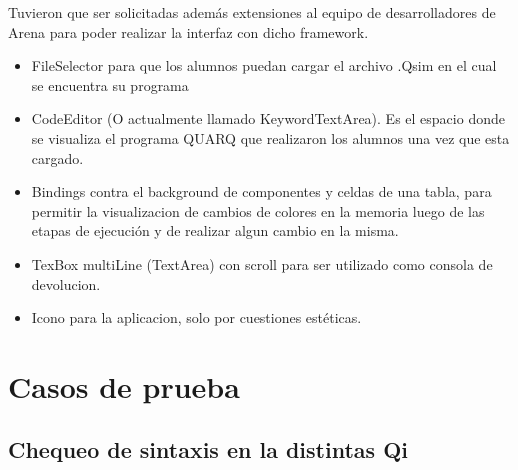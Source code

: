 Tuvieron que ser solicitadas además extensiones al equipo de desarrolladores de Arena para poder realizar la interfaz con dicho framework.

\begin{itemize}
\item FileSelector para que los alumnos puedan cargar el archivo .Qsim en el cual se encuentra su programa
\item CodeEditor (O actualmente llamado KeywordTextArea). Es el espacio donde se visualiza el programa QUARQ que realizaron los alumnos una vez que esta cargado.
\item Bindings contra el background de componentes y celdas de una tabla, para permitir la visualizacion de cambios de colores en la memoria luego de las etapas de ejecución y de realizar algun cambio en la misma.
\item TexBox multiLine (TextArea) con scroll para ser utilizado como consola de devolucion.
\item Icono para la aplicacion, solo por cuestiones estéticas.
\end{itemize}

\section{Casos de prueba}

\subsection{Chequeo de sintaxis en la distintas Qi}

